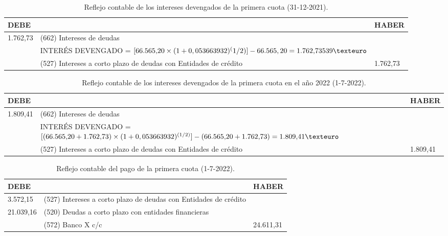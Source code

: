 \begin{table}[H]
    \centering
    \begin{tabular}{|p{2cm}|p{6cm}|p{2cm}|}
    \hline
    \rowcolor{blue!30}
    \textbf{DEBE} & \textbf{} & \textbf{HABER} \\
    \hline
    1.762,73 & (662) Intereses de deudas & \\
    \hline
    & INTERÉS DEVENGADO = $[\text{66.565,20} \times (1 + 0,053663932)^(1/2)] - 66.565,20 = \newline \text{1.762,73539} € $& \\
    \hline
    &(527) Intereses a corto plazo de deudas con Entidades de crédito &  1.762,73 \\
    \hline
    \end{tabular}
    \caption{Reflejo contable de los intereses devengados de la primera cuota (31-12-2021).}
    \label{tabla:intereses_2021}
\end{table}
\begin{table}[H]
    \centering
    \begin{tabular}{|p{2cm}|p{6cm}|p{2cm}|}
    \hline
    \rowcolor{blue!30}
    \textbf{DEBE} & \textbf{} & \textbf{HABER} \\
    \hline
    1.809,41 & (662) Intereses de deudas & \\
    \hline
     & INTERÉS DEVENGADO = $[(\text{66.565,20} + \text{1.762,73}) \times (1 + 0,053663932)^{(1/2)}] - \newline (\text{66.565,20} + \text{1.762,73}) = \text{1.809,41} € $& \\
    \hline
    &(527) Intereses a corto plazo de deudas con Entidades de crédito &  1.809,41 \\
    \hline
    \end{tabular}
    \caption{Reflejo contable de los intereses devengados de la primera cuota en el año 2022 (1-7-2022).}
    \label{tabla:intereses_2022}
\end{table}
\begin{table}[H]
    \centering
    \begin{tabular}{|p{2cm}|p{6cm}|p{2cm}|}
    \hline
    \rowcolor{blue!30}
    \textbf{DEBE} & \textbf{} & \textbf{HABER} \\
    \hline
    3.572,15 & (527) Intereses a corto plazo de deudas con Entidades de crédito & \\
    \hline
    21.039,16 & (520) Deudas a corto plazo con entidades financieras & \\
    \hline
    &(572) Banco X c/c &  24.611,31 \\
    \hline
    \end{tabular}
    \caption{Reflejo contable del pago de la primera cuota (1-7-2022).}
    \label{tabla:pago_cuota}
\end{table}


